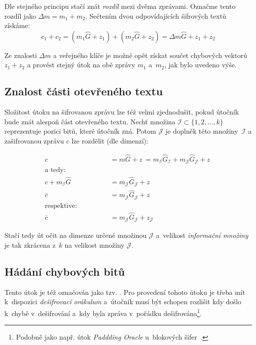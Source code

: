 \documentclass[thesis=M,czech,hidelinks]{FITthesis}[2012/06/26]
\newcommand{\0}{{\textcolor[gray]{0.75}{0}}}
\begin{document}
Dle stejného principu stačí znát \emph{rozdíl} mezi dvěma zprávami. Označme
tento rozdíl jako $\Delta m = m_1 + m_2$. Sečtením dvou odpovídajících šifrových
textů získáme:
$$
    c_1 + c_2 = (m_1\hat{G} + z_1) + (m_2\hat{G} + z_2) =
    \Delta m \hat{G} + z_1 + z_2
$$

Ze znalosti $\Delta m$ a veřejného klíče je možné opět získat součet chybových
vektorů $z_1 + z_2 $ a provést stejný útok na obě zprávy $m_1$ a~$m_2$, jak bylo
uvedeno výše.


\subsection{Znalost části otevřeného textu}

Složitost útoku na šifrovanou zprávu lze též velmi zjednodušit, pokud útočník
bude znát alespoň část otevřeného textu. Nechť množina $\mathcal{I} \subset
\{1,2,\ldots,k\}$ reprezentuje pozici bitů, které útočník zná. Potom
$\mathcal{J}$ je doplněk této množiny~$\mathcal{I}$ a zašifrovanou zprávu $c$
lze rozdělit (dle dimenzí):

\begin{align*}
    c &= m\hat{G} + z~=
    m_{\mathcal{I}}\hat{G}_{\mathcal{I}} + m_{\mathcal{J}}\hat{G}_{\mathcal{J}} + z~\\
    \text{a tedy:} \qquad \qquad \\
    c + m_{\mathcal{I}}\hat{G} &= m_{\mathcal{J}}\hat{G}_{\mathcal{J}} + z~\\
                       \bar{c} &= m_{\mathcal{J}}\hat{G}_{\mathcal{J}} + z~\\
    \text{respektive:} \qquad \qquad \\
                       \bar{c} &= m_{\mathcal{J}}\hat{G}_{\mathcal{J}} + z_{\mathcal{J}}
\end{align*}


Stačí tedy út očit na dimenze určené množinou $\mathcal{J}$ a~velikost
\emph{informační množiny} je tak zkrácena z~$k$ na velikost množiny
$\mathcal{J}$.


\subsection{Hádání chybových bitů}

Tento útok je též označován jako tzv. . Pro provedení tohoto
útoku je třeba mít k~dispozici \emph{dešifrovací orákulum} a~útočník musí být
schopen rozlišit kdy došlo k~chybě v~dešifrování a~kdy byla zpráva v~pořádku
dešifrována\footnote{
    Podobně jako např. útok \emph{Paddding Oracle} u~blokových
    šifer~\cite{FIT_KRY}.
}.
\end{document}
